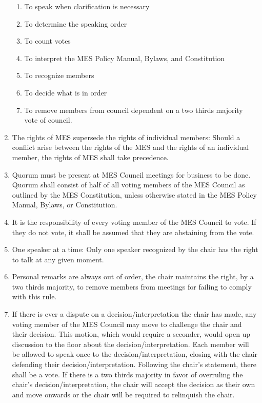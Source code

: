 \begin{enumerate}
  \begin{enumerate}
   \item
    To speak when clarification is necessary
   \item
    To determine the speaking order
   \item
    To count votes
   \item
    To interpret the MES Policy Manual, Bylaws, and Constitution
   \item
    To recognize members
   \item
    To decide what is in order
   \item
    To remove members from council dependent on a two thirds majority
    vote of council.
  \end{enumerate}
 \item
  The rights of MES supersede the rights of individual members: Should a
  conflict arise between the rights of the MES and the rights of an
  individual member, the rights of MES shall take precedence.
 \item
  Quorum must be present at MES Council meetings for business to be
  done. Quorum shall consist of half of all voting members of the MES
  Council as outlined by the MES Constitution, unless otherwise stated
  in the MES Policy Manual, Bylaws, or Constitution.
 \item
  It is the responsibility of every voting member of the MES Council to
  vote. If they do not vote, it shall be assumed that they are
  abstaining from the vote.
 \item
  One speaker at a time: Only one speaker recognized by the chair has
  the right to talk at any given moment.
 \item
  Personal remarks are always out of order, the chair maintains the
  right, by a two thirds majority, to remove members from meetings for
  failing to comply with this rule.
 \item
  If there is ever a dispute on a decision/interpretation the chair has
  made, any voting member of the MES Council may move to challenge the
  chair and their decision. This motion, which would require a seconder,
  would open up discussion to the floor about the
  decision/interpretation. Each member will be allowed to speak once to
  the decision/interpretation, closing with the chair defending their
  decision/interpretation. Following the chair's statement, there shall
  be a vote. If there is a two thirds majority in favor of overruling
  the chair's decision/interpretation, the chair will accept the
  decision as their own and move onwards or the chair will be required
  to relinquish the chair.

\end{enumerate}

